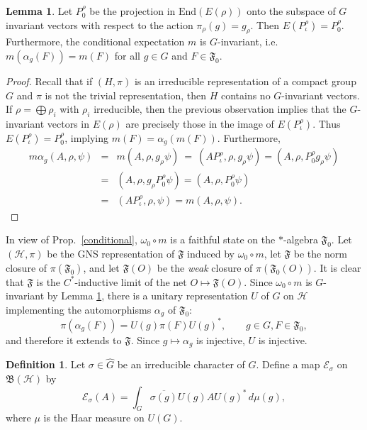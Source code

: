 \documentclass[11pt]{article}
\newcommand{\alg}[1]{\mathfrak{#1}}
\newcommand{\bh}{\mathfrak{B}(\mathcal{H})}
\theoremstyle{definition}
\newtheorem{lemma}[thm]{Lemma}
\theoremstyle{definition}
\newtheorem{defn}[thm]{Definition}
\theoremstyle{remark}
\def\2#1{{\mathcal #1}}
\def\4#1{{\mathscr #1}}
\def\al#1{{\mathfrak #1}}
\def\a{\alpha} \def\b{\beta} \def\g{\gamma} \def\d{\delta}
\def\om{\omega} \def\Om{\Omega} \def\dd{\partial} \def\D{\Delta}
\newcommand{\End}{\mathrm{End}}
\begin{document}
\begin{lemma} Let $P_0^{\rho}$ be the projection in $\End (E(\rho ))$ onto the
  subspace of $G$ invariant vectors with respect to the action $\pi _\rho
  (g)=g_\rho$.  Then $E(P^{\rho }_{\iota})=P_0^{\rho}$.  Furthermore, the conditional
  expectation $m$ is $G$-invariant, i.e.\ $m(\a _g(F))=m(F)$ for all $g\in G$ and
  $F\in \alg{F}_0$.  \label{invariant} \end{lemma}

\begin{proof} Recall that if $(H, \pi )$ is an irreducible representation of a
  compact group $G$ and $\pi$ is not the trivial representation, then $H$ contains no
  $G$-invariant vectors.  If $\rho =\bigoplus \rho _i$ with $\rho _i$ irreducible,
  then the previous observation implies that the $G$-invariant vectors in $E(\rho )$
  are precisely those in the image of $E(P_{\iota}^{\rho})$.  Thus
  $E(P_{\iota}^{\rho})=P_0^{\rho}$, implying $m(F)=\a _g(m(F))$.  Furthermore,
  \begin{eqnarray*} m\alpha _g(A,\rho ,\psi ) &=& m(A,\rho ,g_\rho \psi )\:=\:
    (AP_{\iota}^{\rho},\rho ,g_\rho \psi ) =(A,\rho ,P_{0}^{\rho}g_\rho \psi  ) \\
    &=& (A,\rho ,g_\rho P_{0}^{\rho}\psi ) = (A,\rho ,P_0^{\rho}\psi ) \\ &=&
    (AP_{\iota}^{\rho},\rho ,\psi ) = m(A,\rho ,\psi ).\end{eqnarray*}
\end{proof}

In view of Prop.\ \ref{conditional}, $\om _0\circ m$ is
a faithful state on the $*$-algebra $\al F_0$.  Let
$(\2H ,\pi )$ be the GNS representation of $\al F$
induced by $\om _0\circ m$, let $\al F$ be the norm
closure of $\pi (\al F_0)$, and let $\al F(O)$ be the
\emph{weak} closure of $\pi (\al F_0(O))$.  It is clear
that $\al F$ is the $C^*$-inductive limit of the net
$O\mapsto \al F(O)$.  Since $\om _0\circ m$ is
$G$-invariant by Lemma \ref{invariant}, there is a
unitary representation $U$ of $G$ on $\2H$ implementing
the automorphisms $\a _g$ of $\alg F_0$:
\[ \pi (\a _g(F))= U(g)\pi (F)U(g)^* ,\qquad g\in
G,F\in \alg{F}_0 ,\] and therefore it extends to $\al
F$.  Since $g\mapsto \a _g$ is injective, $U$ is
injective.


\begin{defn} \label{cond-exp}
Let $\sigma \in \hat{G}$ be an irreducible character of $G$.  Define a
  map $\4E _{\sigma}$ on $\bh$ by
\[ \4E _{\sigma}(A)=\int _{G}\overline{\sigma (g)}U(g)AU(g)^{*}\, d\mu (g) ,\] where
$\mu$ is the Haar measure on $U(G)$.  \end{defn}
\end{document}
